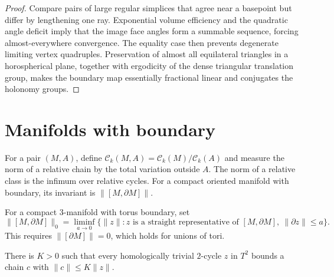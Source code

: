 \begin{proof}
\sketch
Compare pairs of large regular simplices that agree near a basepoint but differ by lengthening one ray. Exponential volume efficiency and the quadratic angle deficit imply that the image face angles form a summable sequence, forcing almost-everywhere convergence. The equality case then prevents degenerate limiting vertex quadruples. Preservation of almost all equilateral triangles in a horospherical plane, together with ergodicity of the dense triangular translation group, makes the boundary map essentially fractional linear and conjugates the holonomy groups.
\end{proof}

\section{Manifolds with boundary}

\begin{definition}
\label{thurston-ch06-relative-gromov-norm}

For a pair $(M,A)$, define $\mathcal C_k(M,A)=\mathcal C_k(M)/\mathcal C_k(A)$ and measure the norm of a relative chain by the total variation outside $A$. The norm of a relative class is the infimum over relative cycles. For a compact oriented manifold with boundary, its invariant is $\|[M,\partial M]\|$.
\end{definition}

\begin{definition}
\label{thurston-ch06-boundary-small-norm}

For a compact $3$-manifold with torus boundary, set
\[
\|[M,\partial M]\|_0=\liminf_{a\to0}\{\|z\|:z\text{ is a straight representative of }[M,\partial M],\ \|\partial z\|\leq a\}.
\]
This requires $\|[\partial M]\|=0$, which holds for unions of tori.
\end{definition}

\begin{proposition}
\label{thurston-ch06-torus-filling-bound}

There is $K>0$ such that every homologically trivial $2$-cycle $z$ in $T^2$ bounds a chain $c$ with $\|c\|\leq K\|z\|$.
\end{proposition}

